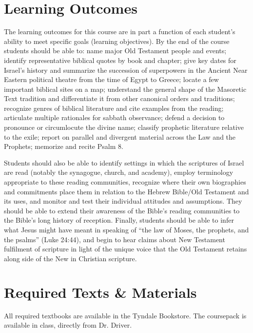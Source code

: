 \documentclass[titlepage]{article}
\newcommand\incl{../includes}
\begin{document}


\section{Learning Outcomes}
\label{outcomes}

The learning outcomes for this course are in part a function of each
student's ability to meet specific goals (learning objectives). By the
end of the course students should be able to:
	name major Old Testament people and events;
	identify representative biblical quotes by book and chapter;
	give key dates for Israel's history and summarize the succession of superpowers in the Ancient Near Eastern political theatre from the time of Egypt to Greece;
	locate a few important biblical sites on a map;
	understand the general shape of the Masoretic Text tradition and differentiate it from other canonical orders and traditions;
	recognize genres of biblical literature and cite examples from the reading;
	articulate multiple rationales for sabbath observance;
	defend a decision to pronounce or circumlocute the divine name;
	classify prophetic literature relative to the exile;
	report on parallel and divergent material across the Law and the Prophets;
	memorize and recite Psalm 8.

Students should also be able to identify settings in which the
scriptures of Israel are read (notably the synagogue, church, and
academy), employ terminology appropriate to these reading communities,
recognize where their own biographies and commitments place them in
relation to the Hebrew Bible/Old Testament and its uses, and monitor and
test their individual attitudes and assumptions. They should be able to
extend their awareness of the Bible's reading communities to the Bible's
long history of reception. Finally, students should be able to infer
what Jesus might have meant in speaking of ``the law of Moses, the
prophets, and the psalms'' (Luke 24:44), and begin to hear claims about
New Testament fulfilment of scripture in light of the unique voice that
the Old Testament retains along side of the New in Christian scripture.

\section{Required Texts \& Materials}
\label{texts}

All required textbooks are available in the Tyndale Bookstore. The
coursepack is available in class, directly from Dr. Driver.
\end{document}
